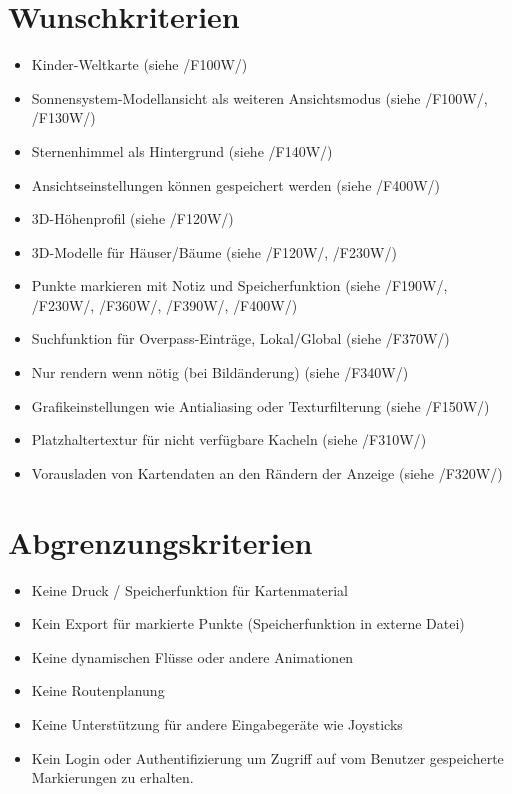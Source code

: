 \documentclass[10pt]{scrreprt}
\newcommand{\ziel}[1]{{\fontsize{9.5}{11}\textsf{/#1/}}}
\begin{document}
\section{Wunschkriterien}
\begin{itemize}
\item Kinder-Weltkarte (siehe \ziel{F100W})
\item Sonnensystem-Modellansicht als weiteren Ansichtsmodus (siehe \ziel{F100W}, \ziel{F130W})
\item Sternenhimmel als Hintergrund (siehe \ziel{F140W})
\item Ansichtseinstellungen können gespeichert werden (siehe \ziel{F400W})
\item 3D-Höhenprofil (siehe \ziel{F120W})
\item 3D-Modelle für Häuser/Bäume (siehe \ziel{F120W}, \ziel{F230W})
\item Punkte markieren mit Notiz und Speicherfunktion (siehe \ziel{F190W}, \ziel{F230W}, \ziel{F360W}, \ziel{F390W}, \ziel{F400W})
\item Suchfunktion für Overpass-Einträge, Lokal/Global (siehe \ziel{F370W})
\item Nur rendern wenn nötig (bei Bildänderung) (siehe \ziel{F340W})
\item Grafikeinstellungen wie Antialiasing oder Texturfilterung (siehe \ziel{F150W})
\item Platzhaltertextur für nicht verfügbare Kacheln (siehe \ziel{F310W})
\item Vorausladen von Kartendaten an den Rändern der Anzeige (siehe \ziel{F320W})
\end{itemize}

\section{Abgrenzungskriterien}
\begin{itemize}
\item Keine Druck / Speicherfunktion für Kartenmaterial
\item Kein Export für markierte Punkte (Speicherfunktion in externe Datei)
\item Keine dynamischen Flüsse oder andere Animationen
\item Keine Routenplanung
\item Keine Unterstützung für andere Eingabegeräte wie Joysticks
\item Kein Login oder Authentifizierung um Zugriff auf vom Benutzer gespeicherte Markierungen zu erhalten.
\end{itemize}
\end{document}
